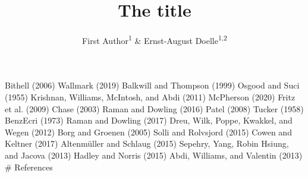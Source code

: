 \documentclass[
  english,
  man]{apa6}
\title{The title}
\author{First Author\textsuperscript{1} \& Ernst-August Doelle\textsuperscript{1,2}}
\date{}
\affiliation{\vspace{0.5cm}\textsuperscript{1} Wilhelm-Wundt-University\\\textsuperscript{2} Konstanz Business School}
\begin{document}
\maketitle

Bithell (2006)
Wallmark (2019)
Balkwill and Thompson (1999)
Osgood and Suci (1955)
Krishnan, Williams, McIntosh, and Abdi (2011)
McPherson (2020)
Fritz et al. (2009)
Chase (2003)
Raman and Dowling (2016)
Patel (2008)
Tucker (1958)
BenzEcri (1973)
Raman and Dowling (2017)
Dreu, Wilk, Poppe, Kwakkel, and Wegen (2012)
Borg and Groenen (2005)
Solli and Rolvsjord (2015)
Cowen and Keltner (2017)
Altenmüller and Schlaug (2015)
Sepehry, Yang, Robin Hsiung, and Jacova (2013)
Hadley and Norris (2015)
Abdi, Williams, and Valentin (2013)
\# References

\begingroup
\setlength{\parindent}{-0.5in}
\setlength{\leftskip}{0.5in}
\end{document}
